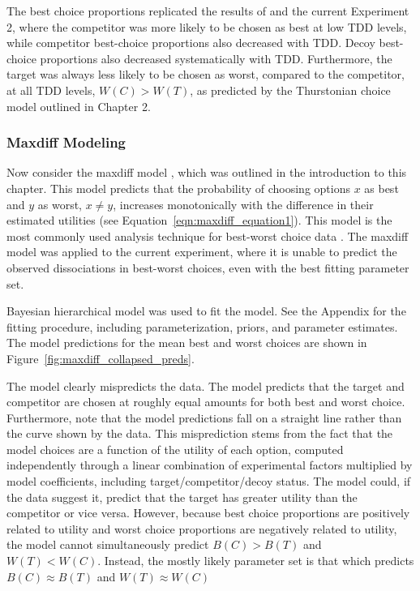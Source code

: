 The best choice proportions replicated the results of \textcite{spektorWhenGoodLooks2018b} and the current Experiment 2, where the competitor was more likely to be chosen as best at low TDD levels, while competitor best-choice proportions also decreased with TDD. Decoy best-choice proportions also decreased systematically with TDD. Furthermore, the target was always less likely to be chosen as worst, compared to the competitor, at all TDD levels, $W(C)>W(T)$, as predicted by the Thurstonian choice model outlined in Chapter 2.

\subsubsection{Maxdiff Modeling}

Now consider the maxdiff model \parencite{marleyProbabilisticModelsBest2005}, which was outlined in the introduction to this chapter. This model predicts that the probability of choosing options $x$ as best and $y$ as worst, $x \neq y$, increases monotonically with the difference in their estimated utilities (see Equation~\ref{eqn:maxdiff_equation1}). This model is the most commonly used analysis technique for best-worst choice data \parencite{flynn2014best}. The maxdiff model was applied to the current experiment, where it is unable to predict the observed dissociations in best-worst choices, even with the best fitting parameter set.

Bayesian hierarchical model was used to fit the model. See the Appendix for the fitting procedure, including parameterization, priors, and parameter estimates. The model predictions for the mean best and worst choices are shown in Figure~\ref{fig:maxdiff_collapsed_preds}.

The model clearly mispredicts the data. The model predicts that the target and competitor are chosen at roughly equal amounts for both best and worst choice. Furthermore, note that the model predictions fall on a straight line rather than the curve shown by the data. This misprediction stems from the fact that the model choices are a function of the utility of each option, computed independently through a linear combination of experimental factors multiplied by model coefficients, including target/competitor/decoy status. The model could, if the data suggest it, predict that the target has greater utility than the competitor or vice versa. However, because best choice proportions are positively related to utility and worst choice proportions are negatively related to utility, the model cannot simultaneously predict $B(C)>B(T)$ and $W(T)<W(C)$. Instead, the mostly likely parameter set is that which predicts $B(C) \approx B(T)$ and $W(T) \approx W(C)$

